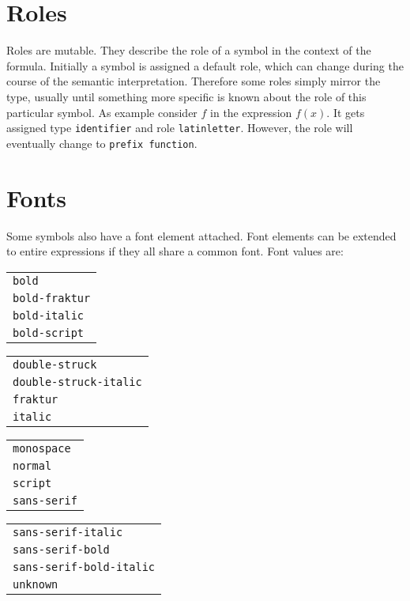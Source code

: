 \documentclass{article}
\begin{document}
\section{Roles}
\label{sec:roles}

Roles are mutable. They describe the role of a symbol in the context of the
formula. Initially a symbol is assigned a default role, which can change during
the course of the semantic interpretation.  Therefore some roles simply mirror
the type, usually until something more specific is known about the role of this
particular symbol. As example consider $f$ in the expression $f(x)$. It gets
assigned type \texttt{identifier} and role \texttt{latinletter}. However, the
role will eventually change to \texttt{prefix function}.




\section{Fonts}
\label{sec:fonts}

Some symbols also have a font element attached. Font elements can be extended to
entire expressions if they all share a common font. Font values are:\vspace*{.5cm}

\noindent
\begin{tabular}{>{\tt}l}
  bold\\
  bold-fraktur\\
  bold-italic\\
  bold-script
\end{tabular}\quad
\begin{tabular}{>{\tt}l}
  double-struck\\
  double-struck-italic\\
  fraktur\\
  italic\\
\end{tabular}\quad
\begin{tabular}{>{\tt}l}
  monospace\\
  normal\\
  script\\
  sans-serif\\
\end{tabular}\quad
\begin{tabular}{>{\tt}l}
  sans-serif-italic\\
  sans-serif-bold\\
  sans-serif-bold-italic\\
  unknown
\end{tabular}
\end{document}
